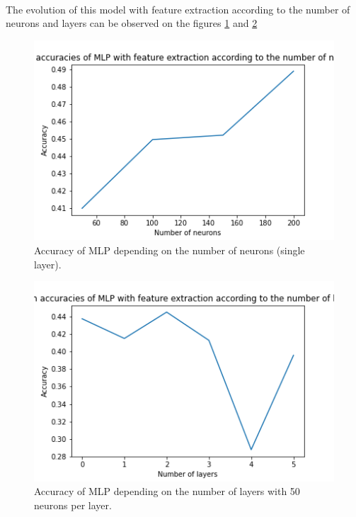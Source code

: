 \documentclass[a4paper, 11pt, oneside]{article}
\begin{document}
\paragraph{}The evolution of this model with feature extraction according to the number of neurons and layers can be observed on the figures \ref{fig:mlp-feature-extraction-neurons} and \ref{fig:mlp-feature-extraction-layers}

\begin{figure}[H]
\centering
\includegraphics[scale=0.4]{mlp/MLP_feature_extraction_neurons.png}
\caption{Accuracy of MLP depending on the number of neurons (single layer).}
\label{fig:mlp-feature-extraction-neurons}
\end{figure}
    
\begin{figure}[H]
\centering
\includegraphics[scale=0.4]{mlp/MLP_feature_extraction_layers.png}
\caption{Accuracy of MLP depending on the number of layers with 50 neurons per layer.}
\label{fig:mlp-feature-extraction-layers}
\end{figure}
\end{document}

